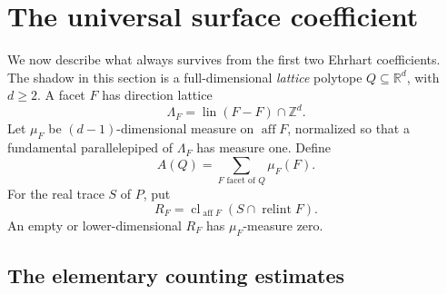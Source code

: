 \documentclass[11pt,a4paper]{article}
\numberwithin{equation}{section}
\theoremstyle{plain}
\newcommand{\R}{\mathbb R}
\newcommand{\Z}{\mathbb Z}
\newcommand{\aff}{\operatorname{aff}}
\newcommand{\relint}{\operatorname{relint}}
\newcommand{\cl}{\operatorname{cl}}
\begin{document}
\section{The universal surface coefficient}\label{poly:ehr:sec:surface}

We now describe what always survives from the first two Ehrhart
coefficients. The shadow in this section is a full-dimensional \emph{lattice}
polytope $Q\subseteq\R^d$, with $d\geq2$. A facet $F$ has direction
lattice
\[
 \Lambda_F=\operatorname{lin}(F-F)\cap\Z^d.
\]
Let $\mu_F$ be $(d-1)$-dimensional measure on $\aff F$, normalized so that
a fundamental parallelepiped of $\Lambda_F$ has measure one. Define
\begin{equation}\label{poly:ehr:eq:boundary-measure}
 A(Q)=\sum_{F\text{ facet of }Q}\mu_F(F).
\end{equation}
For the real trace $S$ of $P$, put
\begin{equation}\label{poly:ehr:eq:facet-piece}
 R_F=\cl_{\aff F}(S\cap\relint F).
\end{equation}
An empty or lower-dimensional $R_F$ has $\mu_F$-measure zero.

\subsection{The elementary counting estimates}
\end{document}
